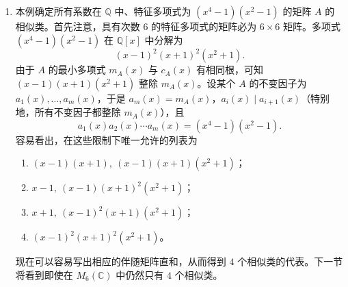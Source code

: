 \begin{enumerate}[label=(\arabic*)]
II.（直接把 $D$ 化为有理标准形）与例 (2) 类似，由对角化 $xI-D$ 所用的行运算确定算法中的矩阵 $P'$。这里 $d_1=2,d_2=2$，分别对应于 $P'$ 的第三与第四个非零列。把这些列分别乘以 $I,D$，即可再次得到上面的矩阵 $P$。

\item 本例确定所有系数在 $\mathbb Q$ 中、特征多项式为 $(x^4-1)(x^2-1)$ 的矩阵 $A$ 的相似类。首先注意，具有次数 $6$ 的特征多项式的矩阵必为 $6\times6$ 矩阵。多项式 $(x^4-1)(x^2-1)$ 在 $\mathbb Q[x]$ 中分解为
\[
(x-1)^2(x+1)^2(x^2+1).
\]
由于 $A$ 的最小多项式 $m_A(x)$ 与 $c_A(x)$ 有相同根，可知 $(x-1)(x+1)(x^2+1)$ 整除 $m_A(x)$。设某个 $A$ 的不变因子为 $a_1(x),\ldots,a_m(x)$，于是 $a_m(x)=m_A(x)$，$a_i(x)\mid a_{i+1}(x)$（特别地，所有不变因子都整除 $m_A(x)$），且
\[
a_1(x)a_2(x)\cdots a_m(x)=(x^4-1)(x^2-1).
\]
容易看出，在这些限制下唯一允许的列表为
\begin{enumerate}[label=(\alph*)]
\item $(x-1)(x+1),\ (x-1)(x+1)(x^2+1)$；
\item $x-1,\ (x-1)(x+1)^2(x^2+1)$；
\item $x+1,\ (x-1)^2(x+1)(x^2+1)$；
\item $(x-1)^2(x+1)^2(x^2+1)$。
\end{enumerate}
现在可以容易写出相应的伴随矩阵直和，从而得到 $4$ 个相似类的代表。下一节将看到即使在 $M_6(\mathbb C)$ 中仍然只有 $4$ 个相似类。


\end{enumerate}
